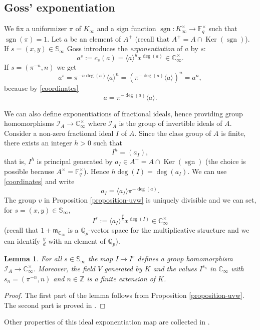 \documentclass[11pt]{amsart}
\numberwithin{equation}{section}
\newcommand{\ZZ}{\mathbb{Z}}
\newcommand{\FF}{\mathbb{F}}
\newcommand{\CC}{\mathbb{C}}
\newcommand{\QQ}{\mathbb{Q}}
\newcommand{\sgn}{\operatorname{sgn}}
\newtheorem{Lemma}[Theorem]{Lemma}
\begin{document}
\subsection{Goss' exponentiation}\label{Goss-exponentiation-section}
We fix a uniformizer $\pi$ of $K_\infty$ and a sign function $\sgn:K_\infty^\times\rightarrow\FF_q^\times$ such that $\sgn(\pi)=1$.
Let $a$ be an element of $A^+$ (recall that $A^+=A\cap\operatorname{Ker}(\sgn)$). If $s=(x,y)\in\mathbb{S}_\infty$ Goss introduces the {\em exponentiation} of $a$ by $s$:
\begin{equation}\label{Goss-exponentiation}a^s:=c_s(a)=\langle a\rangle^y x^{\deg(a)}\in \CC_\infty^\times.
\end{equation}
If $s=(\pi^{-n},n)$ we get
$$a^s=\pi^{-n\deg(a)}\langle a\rangle^n=(\pi^{-\deg(a)}\langle a\rangle)^n=a^n,$$ because by \eqref{coordinates} $$a=\pi^{-\deg(a)}\langle a\rangle.$$

We can also define exponentiations of fractional ideals, hence providing group homomorphisms $\mathcal{I}_A\rightarrow\CC_\infty^\times$ where $\mathcal{I}_A$ is the group of invertible ideals of $A$. 
Consider a non-zero fractional ideal $I$ of $A$. Since the class group of $A$ is finite, there exists an integer $h>0$ such that
$$I^h=(a_I),$$ that is, $I^h$ is principal generated by $a_I\in A^+=A\cap \operatorname{Ker}(\sgn)$ (the choice is possible because $A^\times=\FF_q^\times$). 
Hence $h\deg(I)=\deg(a_I)$. We can use \eqref{coordinates} and write 
$$a_I=\langle a_I \rangle \pi^{-\deg(a)}.$$
The group $v$ in Proposition \ref{proposition-uvw} is uniquely divisible and we can set, for $s=(x,y)\in\mathbb{S}_\infty$,
\begin{equation}\label{I-to-the-s}
I^s:=\langle a_I \rangle^{\frac{y}{h}}x^{\deg(I)}\in\CC_\infty^\times
\end{equation}
(recall that $1+\mathfrak{m}_{\CC_\infty}$
is a $\QQ_p$-vector space for the multiplicative structure and we can identify $\frac{y}{d}$ with an element of $\QQ_p$).

\begin{Lemma}\label{lemma-ext-ideals}
For all $s\in\mathbb{S}_\infty$ the map $I\mapsto I^s$ defines a group homomorphism 
$\mathcal{I}_A\rightarrow\CC_\infty^\times$. Moreover, the 
field $V$ generated by $K$ and the values $I^{s_n}$ in $\CC_\infty$ with $s_n=(\pi^{-n},n)$ and $n\in\ZZ$ is a finite extension of $K$. 
\end{Lemma}

\begin{proof}
The first part of the lemma follows from Proposition \ref{proposition-uvw}. The second part is proved in \cite[Proposition 8.2.9]{GOS}.
\end{proof}
Other properties of this ideal exponentiation map are collected in \cite[\S 8.2]{GOS}. 
\end{document}

